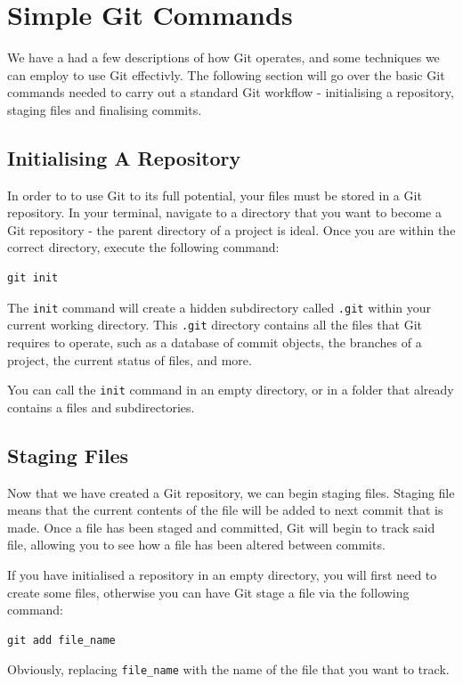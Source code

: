 \documentclass[11pt, a4paper, titlepage]{article}
\begin{document}
\section{Simple Git Commands}
We have a had a few descriptions of how Git operates, and some techniques we
can employ to use Git effectivly.
The following section will go over the basic Git commands needed to carry out
a standard Git workflow - initialising a repository, staging files and
finalising commits.


\subsection{Initialising A Repository}
In order to to use Git to its full potential, your files must be stored in a
Git repository.
In your terminal, navigate to a directory that you want to become a Git
repository - the parent directory of a project is ideal.
Once you are within the correct directory, execute the following command:

\begin{lstlisting}[label=lst_init,
caption=Initialising a new Git repository]
 git init 
\end{lstlisting}

The {\tt init} command will create a hidden subdirectory called {\tt .git}
within your current working directory.
This {\tt .git} directory contains all the files that Git requires to
operate, such as a database of commit objects, the branches of a project, the
current status of files, and more.

You can call the {\tt init} command in an empty directory, or in a folder that
already contains a files and subdirectories.


\subsection{Staging Files}
Now that we have created a Git repository, we can begin staging files.
Staging file means that the current contents of the file will be added to
next commit that is made.
Once a file has been staged and committed, Git will begin to track said file,
allowing you to see how a file has been altered between commits.

If you have initialised a repository in an empty directory, you will first
need to create some files, otherwise you can have Git stage a file via the
following command:
\begin{lstlisting}[label=lst_add_file,
caption=Adding a file to the Stagging area.]
 git add file_name
\end{lstlisting}
Obviously, replacing {\tt file\_name} with the name of the file that you want
to track.
\end{document}
